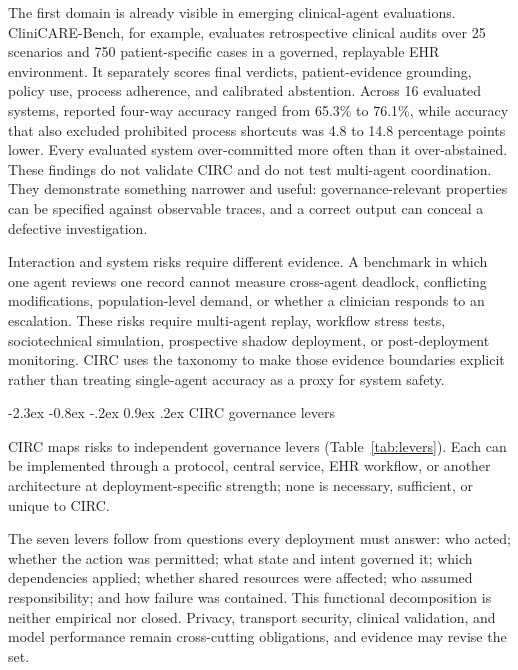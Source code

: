 \documentclass[10pt]{article}
\makeatletter
\renewcommand\section{\@startsection{section}{1}{\z@}%
  {-2.3ex \@plus -0.8ex \@minus -.2ex}%
  {0.9ex \@plus .2ex}%
  {\normalfont\sffamily\bfseries\normalsize}}
\makeatother
\begin{document}
The first domain is already visible in emerging clinical-agent evaluations. CliniCARE-Bench, for
example, evaluates retrospective clinical audits over 25 scenarios and 750 patient-specific cases in
a governed, replayable EHR environment.\cite{chatrath2026clinicare} It separately scores final
verdicts, patient-evidence grounding, policy use, process adherence, and calibrated abstention. Across
16 evaluated systems, reported four-way accuracy ranged from 65.3\% to 76.1\%, while accuracy that
also excluded prohibited process shortcuts was 4.8 to 14.8 percentage points lower. Every evaluated
system over-committed more often than it over-abstained. These findings do not validate CIRC and do
not test multi-agent coordination. They demonstrate something narrower and useful: governance-relevant
properties can be specified against observable traces, and a correct output can conceal a defective
investigation.

Interaction and system risks require different evidence. A benchmark in which one agent reviews one
record cannot measure cross-agent deadlock, conflicting modifications, population-level demand, or
whether a clinician responds to an escalation. These risks require multi-agent replay, workflow stress
tests, sociotechnical simulation, prospective shadow deployment, or post-deployment monitoring. CIRC
uses the taxonomy to make those evidence boundaries explicit rather than treating single-agent
accuracy as a proxy for system safety.

\section{CIRC governance levers}

CIRC maps risks to independent governance levers (Table~\ref{tab:levers}). Each can be implemented
through a protocol, central service, EHR workflow, or another architecture at deployment-specific
strength; none is necessary, sufficient, or unique to CIRC.

The seven levers follow from questions every deployment must answer: who acted; whether the action was
permitted; what state and intent governed it; which dependencies applied; whether shared resources
were affected; who assumed responsibility; and how failure was contained. This functional
decomposition is neither empirical nor closed. Privacy, transport security, clinical validation, and
model performance remain cross-cutting obligations, and evidence may revise the set.
\end{document}
